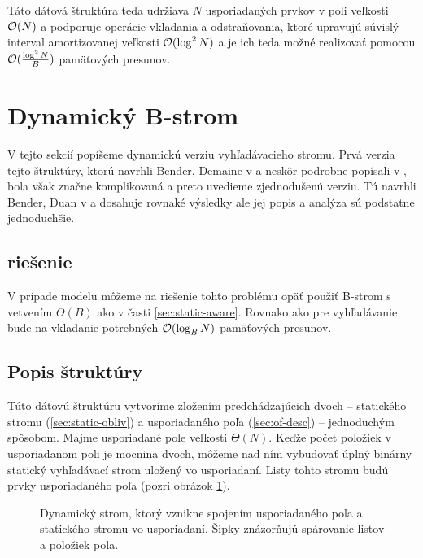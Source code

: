 Táto dátová štruktúra teda udržiava $N$ usporiadaných prvkov v poli veľkosti $\mathcal{O}(N)$ a podporuje operácie vkladania a odstraňovania, ktoré upravujú súvislý interval amortizovanej veľkosti $\mathcal{O}(\log^2{N})$ a je ich teda možné realizovať pomocou $\mathcal{O}(\frac{\log^2{N}}{B})$ pamäťových presunov.

\section{Dynamický B-strom} \label{sec:dynamic-obliv}
V tejto sekcií popíšeme dynamickú verziu \obliv vyhľadávacieho stromu. Prvá verzia tejto štruktúry, ktorú navrhli Bender, Demaine \etal v \citep{btreeshort} a neskôr podrobne popísali v \citep{btreefull}, bola však značne komplikovaná a preto uvedieme zjednodušenú verziu. Tú navrhli Bender, Duan \etal v \citep{bender2002} a dosahuje rovnaké výsledky ale jej popis a analýza sú podstatne jednoduchšie.

\subsection{\Aware riešenie}
V prípade \aware modelu môžeme na riešenie tohto problému opäť použiť B-strom s vetvením $\Theta(B)$ ako v časti \ref{sec:static-aware}. Rovnako ako pre vyhľadávanie bude na vkladanie potrebných $\mathcal{O}(\log_B{N})$ pamäťových presunov.

\subsection{Popis \obliv štruktúry}
Túto dátovú štruktúru vytvoríme zložením predchádzajúcich dvoch -- statického stromu (\ref{sec:static-obliv}) a usporiadaného poľa (\ref{sec:of-desc}) -- jednoduchým spôsobom. Majme usporiadané pole veľkosti $\Theta(N)$. Keďže počet položiek v usporiadanom poli je mocnina dvoch, môžeme nad ním vybudovať úplný binárny statický vyhľadávací strom uložený vo  usporiadaní. Listy tohto stromu budú prvky usporiadaného poľa (pozri obrázok \ref{fig:cobtree_overview}).

\begin{figure}
    \centering
    \resizebox{\textwidth}{!}{
        
    }
    \caption[Dynamický strom]{Dynamický strom, ktorý vznikne spojením usporiadaného poľa a statického stromu vo  usporiadaní. Šipky znázorňujú spárovanie listov a položiek pola.}
    \label{fig:cobtree_overview}
\end{figure}

